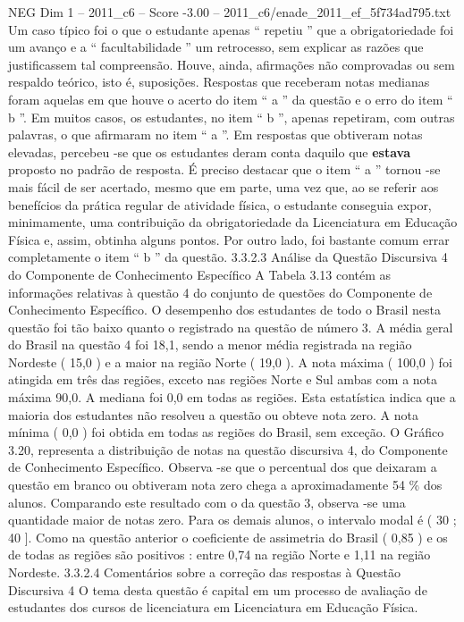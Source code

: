 \begin{textsample}{NEG Dim 1 – 2011\_c6 – Score -3.00 – 2011\_c6/enade\_2011\_ef\_5f734ad795.txt}
Um caso típico foi o que o estudante apenas “ repetiu ” que a obrigatoriedade foi um avanço e a “ facultabilidade ” um retrocesso, sem explicar as razões que justificassem tal compreensão.
Houve, ainda, afirmações não comprovadas ou sem respaldo teórico, isto é, suposições.
Respostas que receberam notas medianas foram aquelas em que houve o acerto do item “ a ” da questão e o erro do item “ b ”.
Em muitos casos, os estudantes, no item “ b ”, apenas repetiram, com outras palavras, o que afirmaram no item “ a ”.
Em respostas que obtiveram notas elevadas, percebeu -se que os estudantes deram conta daquilo que \textbf{estava} proposto no padrão de resposta.
É preciso destacar que o item “ a ” tornou -se mais fácil de ser acertado, mesmo que em parte, uma vez que, ao se referir aos benefícios da prática regular de atividade física, o estudante conseguia expor, minimamente, uma contribuição da obrigatoriedade da Licenciatura em Educação Física e, assim, obtinha alguns pontos.
Por outro lado, foi bastante comum errar completamente o item “ b ” da questão. 3.3.2.3 Análise da Questão Discursiva 4 do Componente de Conhecimento Específico A Tabela 3.13 contém as informações relativas à questão 4 do conjunto de questões do Componente de Conhecimento Específico.
O desempenho dos estudantes de todo o Brasil nesta questão foi tão baixo quanto o registrado na questão de número 3.
A média geral do Brasil na questão 4 foi 18,1, sendo a menor média registrada na região Nordeste ( 15,0 ) e a maior na região Norte ( 19,0 ).
A nota máxima ( 100,0 ) foi atingida em três das regiões, exceto nas regiões Norte e Sul ambas com a nota máxima 90,0.
A mediana foi 0,0 em todas as regiões.
Esta estatística indica que a maioria dos estudantes não resolveu a questão ou obteve nota zero.
A nota mínima ( 0,0 ) foi obtida em todas as regiões do Brasil, sem exceção.
O Gráfico 3.20, representa a distribuição de notas na questão discursiva 4, do Componente de Conhecimento Específico.
Observa -se que o percentual dos que deixaram a questão em branco ou obtiveram nota zero chega a aproximadamente 54 \% dos alunos.
Comparando este resultado com o da questão 3, observa -se uma quantidade maior de notas zero.
Para os demais alunos, o intervalo modal é ( 30 ; 40 ].
Como na questão anterior o coeficiente de assimetria do Brasil ( 0,85 ) e os de todas as regiões são positivos : entre 0,74 na região Norte e 1,11 na região Nordeste. 3.3.2.4 Comentários sobre a correção das respostas à Questão Discursiva 4 O tema desta questão é capital em um processo de avaliação de estudantes dos cursos de licenciatura em Licenciatura em Educação Física.

\end{textsample}
